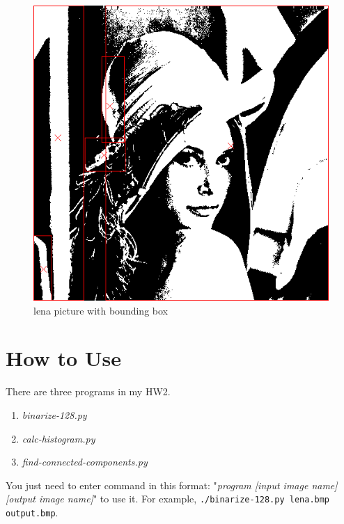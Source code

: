 \documentclass[12pt,twoside,a4paper]{article}
\newcommand{\inlinecode}[1]{\colorbox{backcolour}{\color{darkgray}\texttt{#1}}}
\begin{document}
\begin{figure}[H]
\centering
\includegraphics[scale=0.55]{lena-bounding.bmp}
\caption{lena picture with bounding box}
\label{fig:lena-bounding.bmp}
\end{figure}

\section{How to Use}
There are three programs in my HW2.
\begin{enumerate}
	\item \textit{binarize-128.py}
	\item \textit{calc-histogram.py}
	\item \textit{find-connected-components.py}
\end{enumerate}
You just need to enter command in this format: "\textit{program [input image name] [output image name]}" to use it. For example, \inlinecode{./binarize-128.py lena.bmp output.bmp}.
\end{document}
